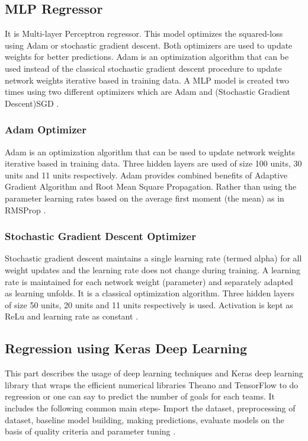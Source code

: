 \subsection{MLP Regressor}
It is Multi-layer Perceptron regressor. This model optimizes the squared-loss using Adam or stochastic gradient descent. Both optimizers are used to update weights for better predictions. Adam is an optimization algorithm that can be used instead of the classical stochastic gradient descent procedure to update network weights iterative based in training data. A MLP model is created two times using two different optimizers which are Adam and (Stochastic Gradient Descent)SGD\cite{tensorflow:tutorial} \cite{tensorflow:keras}.\newline
\subsubsection{Adam Optimizer }
Adam is an optimization algorithm that can be used to update network weights iterative based in training data. Three hidden layers are used of size 100 units, 30 units and 11 units respectively. Adam provides combined benefits of Adaptive Gradient Algorithm and Root Mean Square Propagation. Rather than using the parameter learning rates based on the average first moment (the mean) as in RMSProp\cite{tensorflow:tutorial} \cite{tensorflow:keras}.\newline
\subsubsection{Stochastic Gradient Descent Optimizer }
Stochastic gradient descent maintains a single learning rate (termed alpha) for all weight updates and the learning rate does not change during training. A learning rate is maintained for each network weight (parameter) and separately adapted as learning unfolds. It is a classical optimization algorithm. Three hidden layers of size 50 units, 20 units and 11 units respectively is used. Activation is kept as ReLu and learning rate as constant\cite{tensorflow:tutorial} \cite{tensorflow:keras}.\newline
\subsection{Regression using Keras Deep Learning }
This part describes the usage of deep learning techniques and Keras deep learning library that wraps the efficient numerical libraries Theano and TensorFlow to do regression or one can say to predict the number of goals for each teams. It includes the following common main steps- Import the dataset, preprocessing of dataset, baseline model building, making predictions, evaluate models on the basis of quality criteria and parameter tuning 
\cite{tensorflow:tutorial} \cite{tensorflow:keras}.\newline
